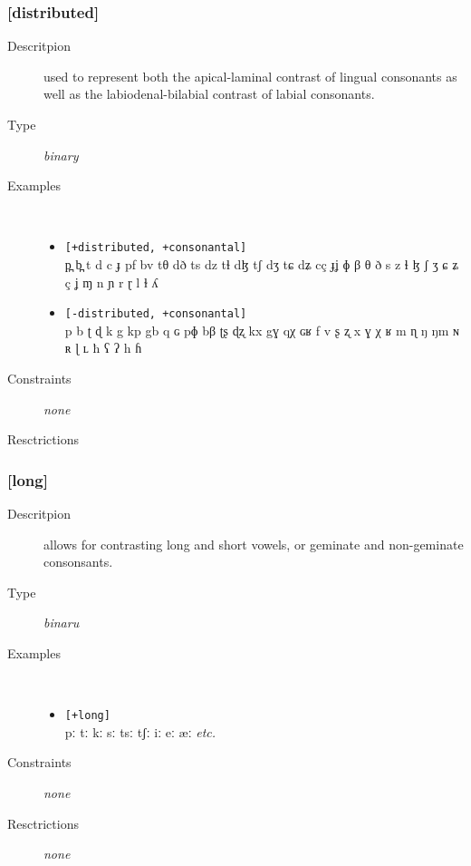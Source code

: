 \documentclass[10pt,letterpaper]{article}
\begin{document}
\subsubsection{[distributed]}
\label{ssub:feature_distributed}

\begin{description}
\item[Descritpion] used to represent both the apical-laminal contrast of lingual consonants as well as the labiodenal-bilabial contrast of labial consonants.
\item[Type] \emph{binary}
\item[Examples]\
  \begin{itemize} 
    \item \texttt{[+distributed, +consonantal]}\\
    p̪ b̪ t d c ɟ pf bv tθ dð ts dz tɬ dɮ tʃ dʒ tɕ dʑ cç ɟʝ ɸ β θ ð s z ɬ ɮ ʃ ʒ ɕ ʑ ç ʝ ɱ n ɲ r ɽ l ɫ ʎ 
    \item \texttt{[-distributed, +consonantal]}\\
    p b ʈ ɖ k g kp gb q ɢ pɸ bβ ʈʂ ɖʐ kx gɣ qχ ɢʁ f v ʂ ʐ x ɣ χ ʁ m ɳ ŋ ŋm ɴ ʀ ɭ ʟ ħ ʕ ʔ h ɦ 
  \end{itemize}
\item[Constraints] \emph{none}
\item[Resctrictions]  %
\end{description}

\subsubsection{[long]}
\label{ssub:feature_long}

\begin{description}
\item[Descritpion] allows for contrasting long and short vowels, or geminate and non-geminate consonsants.
\item[Type] \emph{binaru}
\item[Examples]\
  \begin{itemize}
    \item \texttt{[+long]}\\
    pː tː kː sː tsː tʃː iː eː æː \emph{etc.}
  \end{itemize}
\item[Constraints] \emph{none}
\item[Resctrictions] \emph{none}
\end{description}
\end{document}
